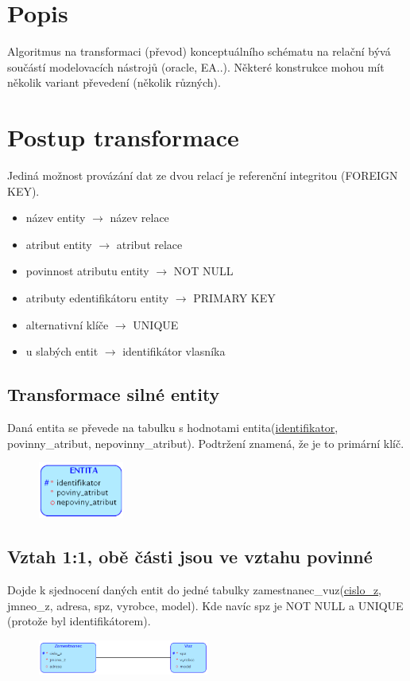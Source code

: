 \documentclass{szzclass}
\begin{document}
\tableofcontents
\newpage

\section{Popis}
Algoritmus na transformaci (převod) konceptuálního schématu na relační bývá součástí modelovacích nástrojů (oracle, EA..).
Některé konstrukce mohou mít několik variant převedení (několik různých).
\section{Postup transformace}
Jediná možnost provázání dat ze dvou relací je referenční integritou (FOREIGN KEY).
\begin{itemize}
    \item název entity $\rightarrow$ název relace
    \item atribut entity $\rightarrow$ atribut relace
    \item povinnost atributu entity $\rightarrow$ NOT NULL
    \item atributy edentifikátoru entity $\rightarrow$ PRIMARY KEY
    \item alternativní klíče $\rightarrow$ UNIQUE
    \item u slabých entit $\rightarrow$ identifikátor vlasníka
\end{itemize}

\subsection{Transformace silné entity}
Daná entita se převede na tabulku s hodnotami entita(\underline{identifikator}, povinny\_atribut, nepovinny\_atribut).
Podtržení znamená, že je to primární klíč.
\begin{figure}[h!]
    \centering
    \includegraphics[width=0.25\textwidth]{topics/bi-wsi-si-02/images/entita.png}
\end{figure}

\subsection{Vztah 1:1, obě části jsou ve vztahu povinné}
Dojde k sjednocení daných entit do jedné tabulky zamestnanec\_vuz(\underline{cislo\_z}, jmneo\_z, adresa, spz, vyrobce, model).
Kde navíc spz je NOT NULL a UNIQUE (protože byl identifikátorem).
\begin{figure}[h!]
    \centering
    \includegraphics[width=0.5\textwidth]{topics/bi-wsi-si-02/images/oneToOne.png}
\end{figure}
\end{document}
